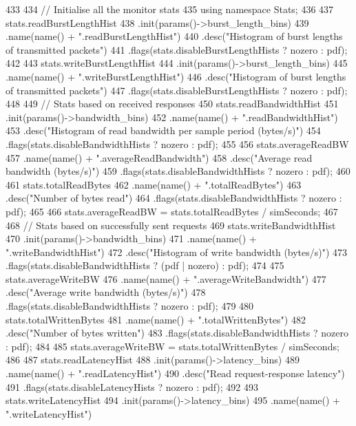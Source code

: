 \begin{DoxyCode}
433 {
434     // Initialise all the monitor stats
435     using namespace Stats;
436 
437     stats.readBurstLengthHist
438         .init(params()->burst_length_bins)
439         .name(name() + ".readBurstLengthHist")
440         .desc("Histogram of burst lengths of transmitted packets")
441         .flags(stats.disableBurstLengthHists ? nozero : pdf);
442 
443     stats.writeBurstLengthHist
444         .init(params()->burst_length_bins)
445         .name(name() + ".writeBurstLengthHist")
446         .desc("Histogram of burst lengths of transmitted packets")
447         .flags(stats.disableBurstLengthHists ? nozero : pdf);
448 
449     // Stats based on received responses
450     stats.readBandwidthHist
451         .init(params()->bandwidth_bins)
452         .name(name() + ".readBandwidthHist")
453         .desc("Histogram of read bandwidth per sample period (bytes/s)")
454         .flags(stats.disableBandwidthHists ? nozero : pdf);
455 
456     stats.averageReadBW
457         .name(name() + ".averageReadBandwidth")
458         .desc("Average read bandwidth (bytes/s)")
459         .flags(stats.disableBandwidthHists ? nozero : pdf);
460 
461     stats.totalReadBytes
462         .name(name() + ".totalReadBytes")
463         .desc("Number of bytes read")
464         .flags(stats.disableBandwidthHists ? nozero : pdf);
465 
466     stats.averageReadBW = stats.totalReadBytes / simSeconds;
467 
468     // Stats based on successfully sent requests
469     stats.writeBandwidthHist
470         .init(params()->bandwidth_bins)
471         .name(name() + ".writeBandwidthHist")
472         .desc("Histogram of write bandwidth (bytes/s)")
473         .flags(stats.disableBandwidthHists ? (pdf | nozero) : pdf);
474 
475     stats.averageWriteBW
476         .name(name() + ".averageWriteBandwidth")
477         .desc("Average write bandwidth (bytes/s)")
478         .flags(stats.disableBandwidthHists ? nozero : pdf);
479 
480     stats.totalWrittenBytes
481         .name(name() + ".totalWrittenBytes")
482         .desc("Number of bytes written")
483         .flags(stats.disableBandwidthHists ? nozero : pdf);
484 
485     stats.averageWriteBW = stats.totalWrittenBytes / simSeconds;
486 
487     stats.readLatencyHist
488         .init(params()->latency_bins)
489         .name(name() + ".readLatencyHist")
490         .desc("Read request-response latency")
491         .flags(stats.disableLatencyHists ? nozero : pdf);
492 
493     stats.writeLatencyHist
494         .init(params()->latency_bins)
495         .name(name() + ".writeLatencyHist")
}
\end{DoxyCode}
